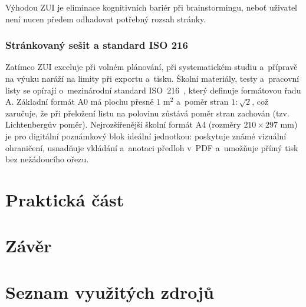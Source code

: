 \documentclass[12pt, a4paper, oneside]{article}
\begin{document}
Výhodou ZUI je eliminace kognitivních bariér při brainstormingu, neboť uživatel není nucen předem odhadovat potřebný rozsah stránky.

\subsubsection{Stránkovaný sešit a standard ISO 216}
Zatímco ZUI exceluje při volném plánování, při systematickém studiu a~přípravě na výuku naráží na limity při exportu a~tisku. Školní materiály, testy a~pracovní listy se opírají o~mezinárodní standard ISO~216~\cite{iso216}, který definuje formátovou řadu A. Základní formát A0 má plochu přesně $1\text{ m}^2$ a~poměr stran $1 : \sqrt{2}$, což zaručuje, že při přeložení listu na polovinu zůstává poměr stran zachován (tzv. Lichtenbergův poměr). Nejrozšířenější školní formát A4 (rozměry $210 \times 297\text{ mm}$) je pro digitální poznámkový blok ideální jednotkou: poskytuje známé vizuální ohraničení, usnadňuje vkládání a~anotaci předloh v~PDF a~umožňuje přímý tisk bez nežádoucího ořezu.

\section{Praktická část}
\label{sec:prakticka_cast}


\section{Závěr}
\label{sec:zaver}




\section{Seznam využitých zdrojů}
\label{sec:zdroje}
\end{document}
